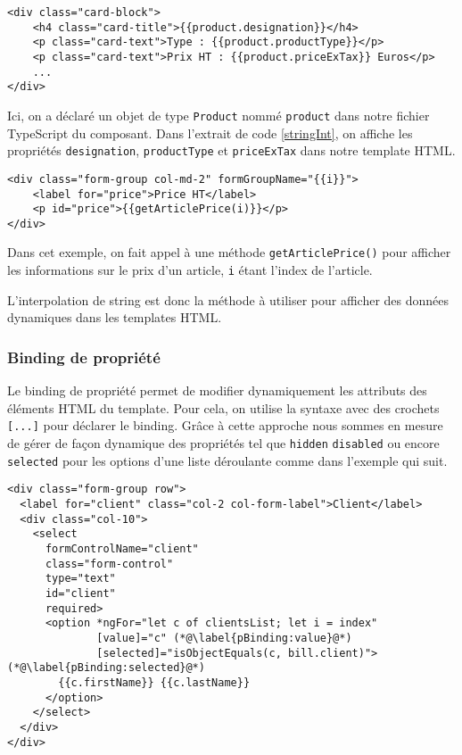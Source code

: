 \begin{lstlisting}[style=htmlcssjs, caption={Interpolation de string}, label=stringInt]
<div class="card-block">
	<h4 class="card-title">{{product.designation}}</h4>
	<p class="card-text">Type : {{product.productType}}</p>
	<p class="card-text">Prix HT : {{product.priceExTax}} Euros</p>
    ...
</div>
\end{lstlisting}
Ici, on a déclaré un objet de type \texttt{Product} nommé \texttt{product} dans notre fichier TypeScript du composant. Dans l'extrait de code \ref{stringInt}, on affiche les propriétés \texttt{designation}, \texttt{productType} et \texttt{priceExTax} dans notre template HTML.

\begin{lstlisting}[style=htmlcssjs, caption={Interpolation de string par une méthode}, label=stringIntMeth]
<div class="form-group col-md-2" formGroupName="{{i}}">
	<label for="price">Price HT</label>
	<p id="price">{{getArticlePrice(i)}}</p>
</div>
\end{lstlisting}
Dans cet exemple, on fait appel à une méthode \texttt{getArticlePrice()} pour afficher les informations sur le prix d'un article, \texttt{i} étant l'index de l'article.

L'interpolation de string est donc la méthode à utiliser pour afficher des données dynamiques dans les templates HTML.

\subsubsection{Binding de propriété}
Le binding de propriété permet de modifier dynamiquement les attributs des éléments HTML du template. Pour cela, on utilise la syntaxe avec des crochets \texttt{[...]} pour déclarer le binding. Grâce à cette approche nous sommes en mesure de gérer de façon dynamique des propriétés tel que \texttt{hidden} \texttt{disabled} ou encore \texttt{selected} pour les options d'une liste déroulante comme dans l'exemple qui suit.

\begin{lstlisting}[style=htmlcssjs, caption={Binding de propriété}, label=pBinding]
<div class="form-group row">
  <label for="client" class="col-2 col-form-label">Client</label>
  <div class="col-10">
    <select
      formControlName="client"
      class="form-control"
      type="text"
      id="client"
      required>
      <option *ngFor="let c of clientsList; let i = index"
              [value]="c" (*@\label{pBinding:value}@*)
              [selected]="isObjectEquals(c, bill.client)"> (*@\label{pBinding:selected}@*)
        {{c.firstName}} {{c.lastName}}
      </option>
    </select>
  </div>
</div>
\end{lstlisting}

